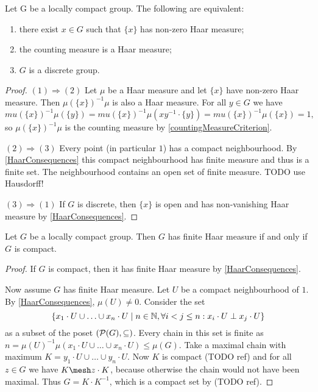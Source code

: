 \begin{proposition}
Let G be a locally compact group. The following are equivalent:
\begin{enumerate}
\item there exist $x\in G$ such that $\{x\}$ has non-zero Haar measure;
\item the counting measure is a Haar measure;
\item $G$ is a discrete group.
\end{enumerate}
\end{proposition}
\begin{proof}
$(1) \Rightarrow (2)$ Let $\mu$ be a Haar measure and let $\{x\}$ have non-zero Haar measure. Then $\mu(\{x\})^{-1}\mu$ is also a Haar measure. For all $y\in G$ we have
\[ mu(\{x\})^{-1}\mu(\{y\}) = mu(\{x\})^{-1}\mu(xy^{-1}\cdot\{y\}) = mu(\{x\})^{-1}\mu(\{x\}) = 1, \]
so $\mu(\{x\})^{-1}\mu$ is the counting measure by \ref{countingMeasureCriterion}.

$(2) \Rightarrow (3)$ Every point (in particular $1$) has a compact neighbourhood. By \ref{HaarConsequences} this compact neighbourhood has finite measure and thus is a finite set. The neighbourhood contains an open set of finite measure. TODO use Hausdorff!

$(3) \Rightarrow (1)$ If $G$ is discrete, then $\{x\}$ is open and has non-vanishing Haar measure by \ref{HaarConsequences}.
\end{proof}

\begin{proposition}
Let $G$ be a locally compact group. Then $G$ has finite Haar measure \textup{if and only if} $G$ is compact.
\end{proposition}
\begin{proof}
If $G$ is compact, then it has finite Haar measure by \ref{HaarConsequences}.

Now assume $G$ has finite Haar measure. Let $U$ be a compact neighbourhood of $1$. By \ref{HaarConsequences}, $\mu(U) \neq 0$. Consider the set
\[ \left\{ x_1\cdot U\cup \ldots \cup x_n\cdot U \;\middle|\; n\in \mathbb{N}, \forall i < j \leq n: x_i\cdot U \perp x_j\cdot U \right\} \]
as a subset of the poset $\left( \operatorname{\mathcal{P}}(G), \subseteq \right)$. Every chain in this set is finite as $n = \mu(U)^{-1}\mu(x_1\cdot U\cup \ldots \cup x_n\cdot U) \leq \mu(G)$. Take a maximal chain with maximum $K = y_1\cdot U\cup \ldots \cup y_n\cdot U$. Now $K$ is compact (TODO ref) and for all $z\in G$ we have $K\mesh z\cdot K$, because otherwise the chain would not have been maximal. Thus $G = K\cdot K^{-1}$, which is a compact set by (TODO ref).
\end{proof}

